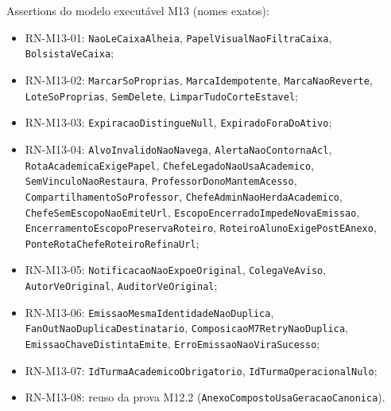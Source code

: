 \noindent Assertions do modelo executável M13 (nomes exatos):
\begin{itemize}
  \item RN-M13-01: \texttt{NaoLeCaixaAlheia}, \newline \texttt{PapelVisualNaoFiltraCaixa}, \newline \texttt{BolsistaVeCaixa};
  \item RN-M13-02: \texttt{MarcarSoProprias}, \newline \texttt{MarcaIdempotente}, \newline \texttt{MarcaNaoReverte}, \newline \texttt{LoteSoProprias}, \newline \texttt{SemDelete}, \newline \texttt{LimparTudoCorteEstavel};
  \item RN-M13-03: \texttt{ExpiracaoDistingueNull}, \newline \texttt{ExpiradoForaDoAtivo};
  \item RN-M13-04: \texttt{AlvoInvalidoNaoNavega}, \newline \texttt{AlertaNaoContornaAcl}, \newline \texttt{RotaAcademicaExigePapel}, \newline \texttt{ChefeLegadoNaoUsaAcademico}, \newline \texttt{SemVinculoNaoRestaura}, \newline \texttt{ProfessorDonoMantemAcesso}, \newline \texttt{CompartilhamentoSoProfessor}, \newline \texttt{ChefeAdminNaoHerdaAcademico}, \newline \texttt{ChefeSemEscopoNaoEmiteUrl}, \newline \texttt{EscopoEncerradoImpedeNovaEmissao}, \newline \texttt{EncerramentoEscopoPreservaRoteiro}, \newline \texttt{RoteiroAlunoExigePostEAnexo}, \newline \texttt{PonteRotaChefeRoteiroRefinaUrl};
  \item RN-M13-05: \texttt{NotificacaoNaoExpoeOriginal}, \newline \texttt{ColegaVeAviso}, \newline \texttt{AutorVeOriginal}, \newline \texttt{AuditorVeOriginal};
  \item RN-M13-06: \texttt{EmissaoMesmaIdentidadeNaoDuplica}, \newline \texttt{FanOutNaoDuplicaDestinatario}, \newline \texttt{ComposicaoM7RetryNaoDuplica}, \newline \texttt{EmissaoChaveDistintaEmite}, \newline \texttt{ErroEmissaoNaoViraSucesso};
  \item RN-M13-07: \texttt{IdTurmaAcademicoObrigatorio}, \newline \texttt{IdTurmaOperacionalNulo};
  \item RN-M13-08: reuso da prova M12.2 (\texttt{AnexoCompostoUsaGeracaoCanonica}).
\end{itemize}

